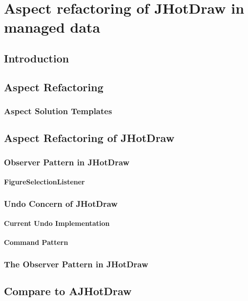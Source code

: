 
\chapter{Aspect refactoring of JHotDraw in managed data}\label{AspectRefactoring}

\section{Introduction}

\section{Aspect Refactoring}

\subsection{Aspect Solution Templates}

\section{Aspect Refactoring of JHotDraw}

\subsection{Observer Pattern in JHotDraw}\label{Observer Pattern in JHotDraw}

\subsubsection{FigureSelectionListener}

\subsection{Undo Concern of JHotDraw}\label{Undo JHotDraw}

\subsubsection{Current Undo Implementation}

\subsubsection{Command Pattern}

\subsection{The Observer Pattern in JHotDraw}\label{The Observer Pattern in JHotDraw}


\section{Compare to AJHotDraw}